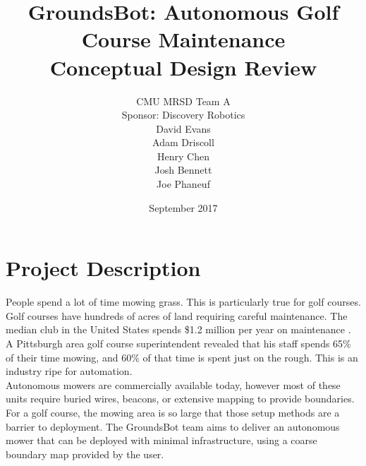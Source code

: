 \documentclass[12pt]{extarticle}
\begin{document}


\title{GroundsBot: Autonomous Golf Course Maintenance \\[.5ex]
		\Large Conceptual Design Review}
\date{September 2017}
\author{CMU MRSD Team A        \\ Sponsor: Discovery Robotics \\ David Evans \\
        Adam Driscoll \\ Henry Chen  \\
        Josh Bennett  \\ Joe Phaneuf \\ }

\maketitle
\def\svgwidth{\columnwidth}

\newpage

\tableofcontents
\newpage

\newpage
\section{Project Description}

People spend a lot of time mowing grass. This is particularly true for golf courses. Golf courses have hundreds of acres of land requiring careful maintenance.  The median club in the United States spends \$1.2 million per year on maintenance \cite{clubbenchmarking}. A Pittsburgh area golf course superintendent \cite{interview-duxbury} revealed that his staff spends 65\% of their time mowing, and 60\% of that time is spent just on the rough. This is an industry ripe for automation.
\\

Autonomous mowers are commercially available today, however most of these units require buried wires, beacons, or extensive mapping to provide boundaries. For a golf course, the mowing area is so large that those setup methods are a barrier to deployment. The GroundsBot team aims to deliver an autonomous mower that can be deployed with minimal infrastructure, using a coarse boundary map provided by the user.

\newpage
\end{document}
